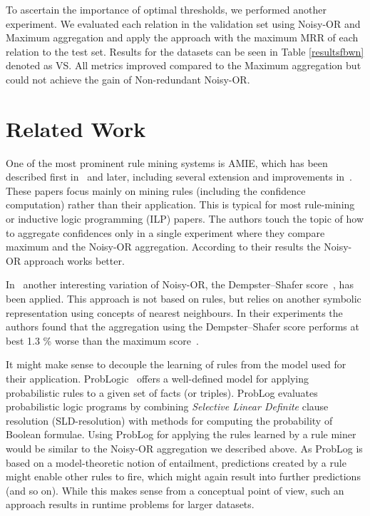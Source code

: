 \documentclass[akbc,twoside,11pt,lettersize]{article}
\begin{document}
To ascertain the importance of optimal thresholds, we performed another experiment. We evaluated each relation in the validation set using Noisy-OR and Maximum aggregation and apply the approach with the maximum MRR of each relation to the test set. Results for the datasets can be seen in Table \ref{resultsfbwn} denoted as VS. All metrics improved compared to the Maximum aggregation but could not achieve the gain of Non-redundant Noisy-OR.

\section{Related Work}


One of the most prominent rule mining systems is AMIE, which has been described first in~\cite{Galarraga2015} and later, including several extension and improvements in~\cite{lajus2020fast}. These papers focus mainly on mining rules (including the confidence computation) rather than their application. This is typical for most rule-mining or inductive logic programming (ILP) papers. The authors touch the topic of how to aggregate confidences only in a single experiment where they compare maximum and the Noisy-OR aggregation. According to their results the Noisy-OR approach works better.

In~\cite{Ferre2020} another interesting variation of Noisy-OR, the Dempster–Shafer score~\cite{denoeux}, has been applied. This approach is not based on rules, but relies on another symbolic representation using concepts of nearest neighbours. In their experiments the authors found that the aggregation using the Dempster–Shafer score performs at best 1.3 \% worse than the maximum score~\cite{Ferre2020}.

It might make sense to decouple the learning of rules from the model used for their application. ProbLogic~\cite{de2007problog} offers a well-defined model for applying probabilistic rules to a given set of facts (or triples). ProbLog evaluates probabilistic logic programs by combining \textit{Selective Linear Definite} clause resolution (SLD-resolution) with methods for computing the probability of Boolean formulae. Using ProbLog for applying the rules learned by a rule miner would be similar to the Noisy-OR aggregation we described above. As ProbLog is based on a model-theoretic notion of entailment, predictions created by a rule might enable other rules to fire, which might again result into further predictions (and so on). While this makes sense from a conceptual point of view, such an approach results in runtime problems for larger datasets.
\end{document}
